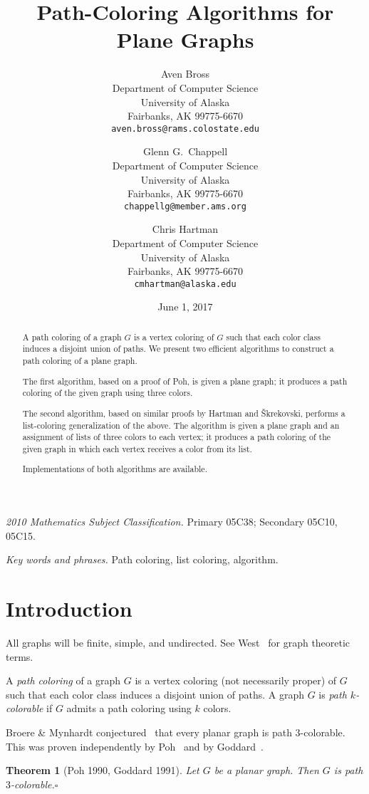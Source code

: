 \documentclass[12pt,letterpaper]{article}
\date{June 1, 2017}
\title{Path-Coloring Algorithms for Plane Graphs}
\author{Aven Bross\\
\small Department of Computer Science\\
\small University of Alaska\\
\small Fairbanks, AK 99775-6670\\
\small\texttt{aven.bross{@}rams.colostate.edu} \and
Glenn G.~Chappell\\
\small Department of Computer Science\\
\small University of Alaska\\
\small Fairbanks, AK 99775-6670\\
\small\texttt{chappellg{@}member.ams.org} \and
Chris Hartman\\
\small Department of Computer Science\\
\small University of Alaska\\
\small Fairbanks, AK 99775-6670\\
\small\texttt{cmhartman{@}alaska.edu}}
\theoremstyle{plain}
\newtheorem{theorem}[lemma]{Theorem}         %
\theoremstyle{definition}
\newcommand{\ggcqedsymbol}{$\square$}
\newcommand{\ggcqed}{\hbox{}\nobreak\hbox{\quad\ggcqedsymbol}}
\newcommand{\ggcnopf}{\ggcqed}
\newcommand{\defterm}[1]{\emph{#1}} %
\newcommand{\abstdefterm}[1]{#1} %
\begin{document}
\maketitle
\centerline{\small \textit{2010 Mathematics Subject Classification.}
 Primary 05C38; Secondary 05C10, 05C15.}
\centerline{\small \textit{Key words and phrases.}
 Path coloring, list coloring, algorithm.}

\begin{abstract}
A \abstdefterm{path coloring} of a graph $G$ is a vertex coloring
of $G$ such that each color class induces a disjoint union of paths.
We present two efficient algorithms
to construct a path coloring of a plane graph.

The first algorithm, based on a proof of Poh, %
is given a plane graph;
it produces a path coloring of the given graph
using three colors.

The second algorithm,
based on similar proofs
by Hartman %
and \v{S}krekovski, %
performs a list-coloring generalization of the above.
The algorithm is given a plane graph and an assignment of lists of
three colors to each vertex;
it produces a path coloring of the given graph
in which each vertex receives a color from its list.

Implementations of both algorithms are available.
\end{abstract}


\section{Introduction}

All graphs will be finite, simple, and undirected.
See West~\cite{Wes2000} for graph theoretic terms.

A \defterm{path coloring} of a graph $G$ is a vertex coloring
(not necessarily proper) of $G$ such that each color class induces
a disjoint union of paths.
A graph $G$ is \defterm{path $k$-colorable} if $G$
admits a path coloring using $k$ colors.

Broere \& Mynhardt conjectured~\cite[Conj.~16]{BrMy1985}
that every planar graph is path $3$-colorable.
This was proven independently by Poh~\cite[Thm.~2]{Poh1990}
and by Goddard~\cite[Thm.~1]{God1991}.

\begin{theorem}[Poh 1990, Goddard 1991] \label{T:planar3c}
Let $G$ be a planar graph.
Then $G$ is path $3$-colorable.\ggcnopf\end{theorem}
\end{document}

